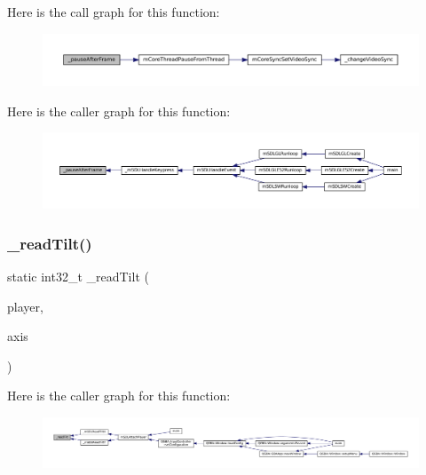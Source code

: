 Here is the call graph for this function\+:
\nopagebreak
\begin{figure}[H]
\begin{center}
\leavevmode
\includegraphics[width=350pt]{sdl-events_8c_a9975fd4e100657c0625df03e039dba9d_cgraph}
\end{center}
\end{figure}
Here is the caller graph for this function\+:
\nopagebreak
\begin{figure}[H]
\begin{center}
\leavevmode
\includegraphics[width=350pt]{sdl-events_8c_a9975fd4e100657c0625df03e039dba9d_icgraph}
\end{center}
\end{figure}
\mbox{\label{sdl-events_8c_a42f03cbde6b9c602263a251937d49567}} 
\subsubsection{\texorpdfstring{\+\_\+read\+Tilt()}{\_readTilt()}}
{\footnotesize\ttfamily static int32\+\_\+t \+\_\+read\+Tilt (\begin{DoxyParamCaption}\item[{struct \mbox{\hyperlink{sdl-events_8h_structm_s_d_l_player}{m\+S\+D\+L\+Player}} $\ast$}]{player,  }\item[{\mbox{\hyperlink{ioapi_8h_a787fa3cf048117ba7123753c1e74fcd6}{int}}}]{axis }\end{DoxyParamCaption})\hspace{0.3cm}{\ttfamily [static]}}

Here is the caller graph for this function\+:
\nopagebreak
\begin{figure}[H]
\begin{center}
\leavevmode
\includegraphics[width=350pt]{sdl-events_8c_a42f03cbde6b9c602263a251937d49567_icgraph}
\end{center}
\end{figure}
\mbox{\label{sdl-events_8c_aca1b25e3f45413ba1b117cc84937ede0}} 
